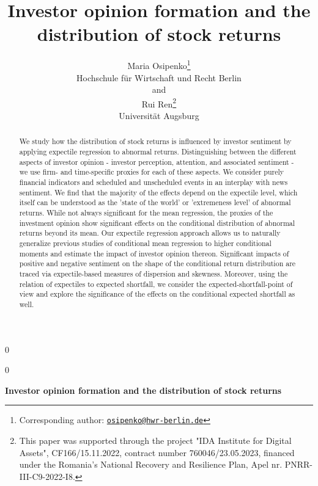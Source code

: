 \documentclass[11pt]{article}
\date{}
\newcommand{\blind}{0}
\begin{document}
\def\spacingset#1{\renewcommand{\baselinestretch}%
{#1}\small\normalsize} \spacingset{1}

\blind
{
  \title{\bf Investor opinion formation and the distribution of stock returns}
  \author{Maria Osipenko\hspace{.2cm}\thanks{Corresponding author: \href{mailto:osipenko@hwr-berlin.de}{\nolinkurl{osipenko@hwr-berlin.de}}}\\
    Hochschule für Wirtschaft und Recht Berlin\\
    and \\
    Rui Ren\thanks{This paper was supported through the project "IDA Institute for Digital Assets", CF166/15.11.2022, contract number  760046/23.05.2023, financed under the Romania’s National Recovery and Resilience Plan, Apel nr. PNRR-III-C9-2022-I8.} \\
    Universität Augsburg}
  \maketitle
} \fi

\blind
{
  \bigskip
  \bigskip
  \bigskip
  \begin{center}
    {\LARGE\bf Investor opinion formation and the distribution of stock returns}
\end{center}
  \medskip
} \fi

\bigskip

\begin{abstract}
We study how the distribution of stock returns is influenced by investor sentiment by applying expectile regression to abnormal returns. Distinguishing between the different aspects of investor opinion - investor perception, attention, and associated sentiment - we use firm- and time-specific proxies for each of these aspects. We consider purely financial indicators and scheduled and unscheduled events in an interplay with news sentiment. We find that the majority of the effects depend on the expectile level, which itself can be understood as the 'state of the world' or 'extremeness level' of abnormal returns. While not always significant for the mean regression, the proxies of the investment opinion show significant effects on the conditional distribution of abnormal returns beyond its mean. Our expectile regression approach allows us to naturally generalize previous studies of conditional mean regression to higher conditional moments and estimate the impact of investor opinion thereon. Significant impacts of positive and negative sentiment on the shape of the conditional return distribution are traced via expectile-based measures of dispersion and skewness. Moreover, using the relation of expectiles to expected shortfall, we consider the expected-shortfall-point of view and explore the significance of the effects on the conditional expected shortfall as well.
\end{abstract}
\end{document}
